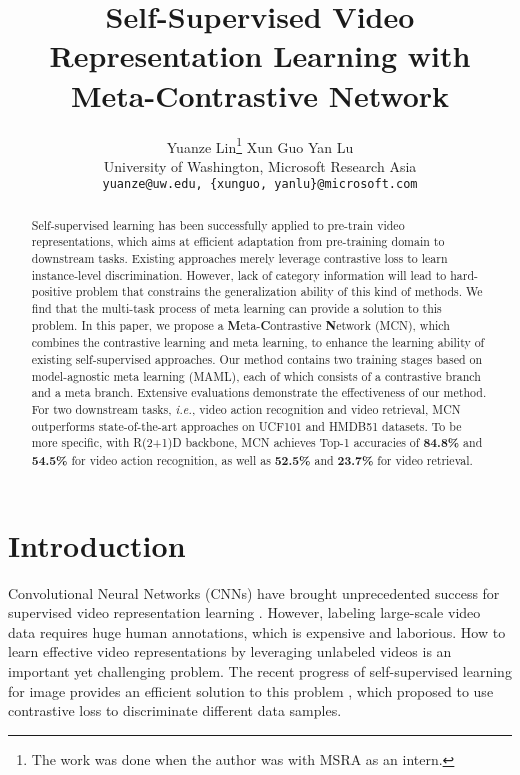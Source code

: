 \documentclass[10pt,twocolumn,letterpaper]{article}
\begin{document}
\title{Self-Supervised Video Representation Learning with Meta-Contrastive Network}

\author{Yuanze Lin\thanks{The work was done when the author was with MSRA as an intern.} \quad \quad Xun Guo \quad \quad Yan Lu\\
University of Washington, \quad Microsoft Research Asia\\
{\tt\small yuanze@uw.edu, \quad \{xunguo, yanlu\}@microsoft.com}\\
}

\maketitle


\begin{abstract}
Self-supervised learning has been successfully applied to pre-train video representations, which aims at efficient adaptation from pre-training domain to downstream tasks. Existing approaches merely leverage contrastive loss to learn instance-level discrimination. However, lack of category information will lead to hard-positive problem that constrains the generalization ability of this kind of methods. We find that the multi-task process of meta learning can provide a solution to this problem. In this paper, we propose a \textbf{M}eta-\textbf{C}ontrastive \textbf{N}etwork (MCN), which combines the contrastive learning and meta learning, to enhance the learning ability of existing self-supervised approaches. Our method contains two training stages based on model-agnostic meta learning (MAML), each of which consists of a contrastive branch and a meta branch. Extensive evaluations demonstrate the effectiveness of our method. For two downstream tasks, \textit{i.e.}, video action recognition and video retrieval, MCN outperforms state-of-the-art approaches on UCF101 and HMDB51 datasets. To be more specific, with R(2+1)D backbone, MCN achieves Top-1 accuracies of \textbf{84.8\%} and \textbf{54.5\%} for video action recognition, as well as \textbf{52.5\%} and \textbf{23.7\%} for video retrieval.

\end{abstract}
\section{Introduction}
Convolutional Neural Networks (CNNs) have brought unprecedented success for supervised video representation learning \cite{carreira2017quo, feichtenhofer2019slowfast, feichtenhofer2016convolutional, wang2016temporal, lin2019tsm} . However, labeling large-scale video data requires huge human annotations, which is expensive and laborious. How to learn effective video representations by leveraging unlabeled videos is an important yet challenging problem. The recent progress of self-supervised learning for image provides an efficient solution to this problem \cite{he2020momentum, tian2019contrastive, henaff2020data, chen2020simple}, which proposed to use contrastive loss \cite{gutmann2010noise, hadsell2006dimensionality, wang2015unsupervised, wu2018unsupervised, hjelm2018learning} to discriminate different data samples. 
\end{document}
